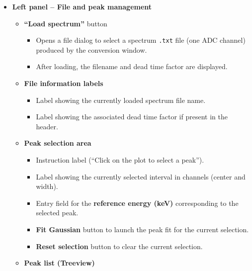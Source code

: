 \begin{itemize}
\item
  \textbf{Left panel -- File and peak management}

  \begin{itemize}
  \tightlist
  \item
    \textbf{``Load spectrum''} button

    \begin{itemize}
    \tightlist
    \item
      Opens a file dialog to select a spectrum \texttt{.txt} file (one
      ADC channel) produced by the conversion window.\\
    \item
      After loading, the filename and dead time factor are displayed.
    \end{itemize}
  \item
    \textbf{File information labels}

    \begin{itemize}
    \tightlist
    \item
      Label showing the currently loaded spectrum file name.\\
    \item
      Label showing the associated dead time factor if present in the
      header.
    \end{itemize}
  \item
    \textbf{Peak selection area}

    \begin{itemize}
    \tightlist
    \item
      Instruction label (``Click on the plot to select a peak'').\\
    \item
      Label showing the currently selected interval in channels (center
      and width).\\
    \item
      Entry field for the \textbf{reference energy (keV)} corresponding
      to the selected peak.\\
    \item
      \textbf{Fit Gaussian} button to launch the peak fit for the
      current selection.\\
    \item
      \textbf{Reset selection} button to clear the current selection.
    \end{itemize}
  \item
    \textbf{Peak list (Treeview)}


\end{itemize}
\end{itemize}
